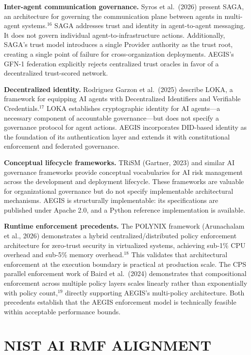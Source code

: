 \documentclass{IEEEcsmag}
\begin{document}
{\bf Inter-agent communication governance.} Syros et al.\ (2026) present SAGA, an architecture for governing the communication plane between agents in multi-agent systems.$^{16}$ SAGA addresses trust and identity in agent-to-agent messaging. It does not govern individual agent-to-infrastructure actions. Additionally, SAGA's trust model introduces a single Provider authority as the trust root, creating a single point of failure for cross-organization deployments. AEGIS's GFN-1 federation explicitly rejects centralized trust oracles in favor of a decentralized trust-scored network.

{\bf Decentralized identity.} Rodriguez Garzon et al.\ (2025) describe LOKA, a framework for equipping AI agents with Decentralized Identifiers and Verifiable Credentials.$^{17}$ LOKA establishes cryptographic identity for AI agents---a necessary component of accountable governance---but does not specify a governance protocol for agent actions. AEGIS incorporates DID-based identity as the foundation of its authentication layer and extends it with constitutional enforcement and federated governance.

{\bf Conceptual lifecycle frameworks.} TRiSM (Gartner, 2023) and similar AI governance frameworks provide conceptual vocabularies for AI risk management across the development and deployment lifecycle. These frameworks are valuable for organizational governance but do not specify implementable architectural mechanisms. AEGIS is structurally implementable: its specifications are published under Apache 2.0, and a Python reference implementation is available.

{\bf Runtime enforcement precedents.} The POLYNIX framework (Arunachalam et al., 2026) demonstrates a hybrid centralized/distributed policy enforcement architecture for zero-trust security in virtualized systems, achieving sub-1\% CPU overhead and sub-5\% memory overhead.$^{18}$ This validates that architectural enforcement at the execution boundary is practical at production scale. The CPS parallel enforcement work of Baird et al.\ (2024) demonstrates that compositional enforcement across multiple policy layers scales linearly rather than exponentially with policy count,$^{19}$ directly supporting AEGIS's multi-policy architecture. Both precedents establish that the AEGIS enforcement model is technically feasible within acceptable performance bounds.

\section{NIST AI RMF ALIGNMENT}
\end{document}
